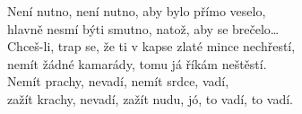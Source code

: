 \nv{}Není nutno, není nutno, aby bylo přímo veselo,\\
hlavně nesmí býti smutno, natož, aby se brečelo\dots{}\\
Chceš-li, trap se, že ti v kapse zlaté mince nechřestí,\\
\vnv
{}nemít žádné kamarády, tomu já říkám neštěstí.\\
Nemít prachy, nevadí, nemít srdce, vadí,\\
\vnv
zažít krachy, nevadí, zažít nudu, jó, to vadí, to vadí.\\
\newpage
